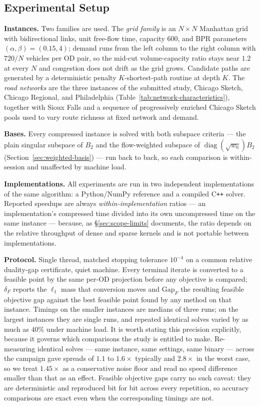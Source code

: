 \documentclass[11pt]{article}
\begin{document}
\subsection{Experimental Setup}
\label{sec:setup}


\textbf{Instances.} Two families are used. The \emph{grid family} is an $N\times N$
Manhattan grid with bidirectional links, unit free-flow time, capacity $600$, and BPR
parameters $(\alpha,\beta)=(0.15,4)$; demand runs from the left column to the right column
with $720/N$ vehicles per OD pair, so the mid-cut volume-capacity ratio stays near $1.2$ at
every $N$ and congestion does not drift as the grid grows. Candidate paths are generated by
a deterministic penalty $K$-shortest-path routine at depth $K$. The \emph{road networks} are
the three instances of the submitted study, Chicago Sketch, Chicago Regional, and
Philadelphia (Table~\ref{tab:network-characteristics}), together with Sioux Falls and a
sequence of progressively enriched Chicago Sketch pools used to vary route richness at fixed
network and demand.

\textbf{Bases.} Every compressed instance is solved with both subspace criteria --- the plain
singular subspace of $B_2$ and the flow-weighted subspace of
$\operatorname{diag}(\sqrt{w_0})B_2$ (Section~\ref{sec:weighted-basis}) --- run back to back, so
each comparison is within-session and unaffected by machine load.

\textbf{Implementations.} All experiments are run in two independent implementations of the
same algorithm: a Python/NumPy reference and a compiled C\texttt{++} solver. Reported
speedups are always \emph{within-implementation} ratios --- an implementation's compressed
time divided into its own uncompressed time on the same instance --- because, as
\S\ref{sec:scope-limits} documents, the ratio depends on the relative throughput of dense and
sparse kernels and is not portable between implementations.

\textbf{Protocol.} Single thread, matched stopping tolerance $10^{-4}$ on a common relative
duality-gap certificate, quiet machine. Every terminal iterate is converted to a feasible
point by the same per-OD projection before any objective is compared; $\delta_F$ reports the
$\ell_1$ mass that conversion moves and $\mathrm{Gap}_F$ the resulting feasible objective
gap against the best feasible point found by any method on that instance. Timings on the
smaller instances are medians of three runs; on the largest instances they are single runs,
and repeated identical solves varied by as much as $40\%$ under machine load. It is worth
stating this precision explicitly, because it governs which comparisons the study is entitled
to make. Re-measuring identical solves --- same instance, same settings, same binary --- across
the campaign gave spreads of $1.1$ to $1.6\times$ typically and $2.8\times$ in the worst case,
so we treat $1.45\times$ as a conservative noise floor and read no speed difference smaller
than that as an effect. Feasible objective gaps carry no such caveat: they are deterministic
and reproduced bit for bit across every repetition, so accuracy comparisons are exact even when
the corresponding timings are not.
\end{document}
